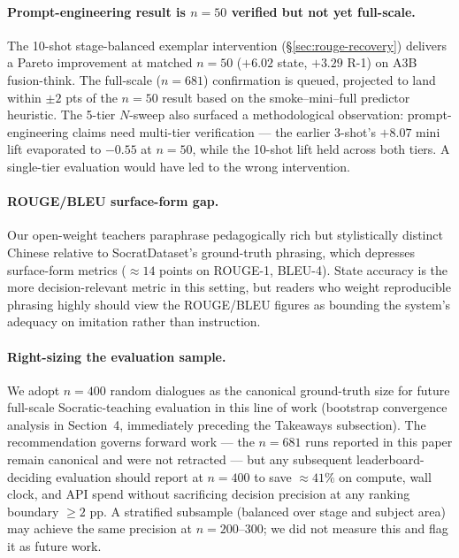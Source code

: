 \documentclass[11pt]{article}
\begin{document}
\paragraph{Prompt-engineering result is $n{=}50$ verified but not yet full-scale.} The 10-shot stage-balanced exemplar intervention (\S\ref{sec:rouge-recovery}) delivers a Pareto improvement at matched $n{=}50$ ($+6.02$ state, $+3.29$ R-1) on A3B fusion-think. The full-scale ($n{=}681$) confirmation is queued, projected to land within $\pm 2$ pts of the $n{=}50$ result based on the smoke--mini--full predictor heuristic. The 5-tier $N$-sweep also surfaced a methodological observation: prompt-engineering claims need multi-tier verification --- the earlier 3-shot's $+8.07$ mini lift evaporated to $-0.55$ at $n{=}50$, while the 10-shot lift held across both tiers. A single-tier evaluation would have led to the wrong intervention.

\paragraph{ROUGE/BLEU surface-form gap.} Our open-weight teachers paraphrase pedagogically rich but stylistically distinct Chinese relative to SocratDataset's ground-truth phrasing, which depresses surface-form metrics ($\approx 14$ points on ROUGE-1, BLEU-4). State accuracy is the more decision-relevant metric in this setting, but readers who weight reproducible phrasing highly should view the ROUGE/BLEU figures as bounding the system's adequacy on imitation rather than instruction.

\paragraph{Right-sizing the evaluation sample.} We adopt $n{=}400$ random dialogues as the canonical ground-truth size for future full-scale Socratic-teaching evaluation in this line of work (bootstrap convergence analysis in Section~4, immediately preceding the Takeaways subsection). The recommendation governs forward work --- the $n{=}681$ runs reported in this paper remain canonical and were not retracted --- but any subsequent leaderboard-deciding evaluation should report at $n{=}400$ to save $\approx 41\%$ on compute, wall clock, and API spend without sacrificing decision precision at any ranking boundary $\geq 2$ pp. A stratified subsample (balanced over stage and subject area) may achieve the same precision at $n{=}200$--$300$; we did not measure this and flag it as future work.
\end{document}
